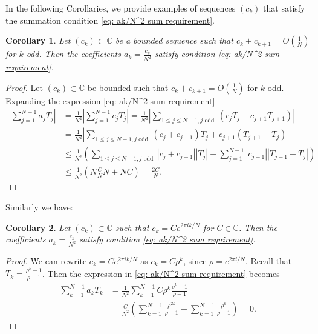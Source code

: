 \documentclass{amsart}
\newtheorem{cor}{Corollary}
\theoremstyle{remark}
\theoremstyle{definition}
\newcommand{\lp}{\left(}
\newcommand{\rp}{\right)}
\begin{document}
In the following Corollaries, we provide examples of sequences $(c_k)$ that satisfy the summation condition \eqref{eq: ak/N^2 sum requirement}. 

\begin{cor}\label{consecutive}
	Let $(c_k)\subset\mathbb{C}$ be a bounded sequence such that $c_k+c_{k+1}=O\lp\frac{1}{N}\rp$ for $k$ odd. Then the coefficients $a_k=\frac{c_k}{N^2}$
satisfy condition \eqref{eq: ak/N^2 sum requirement}.
\end{cor}

\begin{proof}
	Let $(c_k)\subset\mathbb{C}$ be bounded such that $c_k+c_{k+1}=O\lp\frac{1}{N}\rp$ for $k$ odd. 
	Expanding the expression \eqref{eq: ak/N^2 sum requirement} 
	\begin{align*}
        \left|\sum_{j=1}^{N-1}a_jT_j\right| 
        &= \frac{1}{N^2}\left|\sum_{j=1}^{N-1}  c_jT_j\right|=\frac{1}{N^2}\left|\sum_{1\leq j\leq N-1, j \textrm { odd }} (c_jT_j+c_{j+1}T_{j+1})\right|\\
		&= \frac{1}{N^2}\left|\sum_{1\leq j\leq N-1, j \textrm { odd }} (c_j+c_{j+1})T_j+c_{j+1}(T_{j+1}-T_j)\right|\\
        &\leq \frac{1}{N^2}\left(\sum_{1\leq j\leq N-1, j \textrm { odd }} |c_j+c_{j+1}||T_j|+\sum_{j=1}^{N-1}|c_{j+1}||T_{j+1}-T_j|\right)\\
        &\leq \frac{1}{N^2}\left(N\frac{C}{N}N+NC\right)=\frac{2C}{N}.
	\end{align*}
\end{proof}

Similarly we have:

\begin{cor}\label{expsums}
	Let $(c_k)\subset\mathbb{C}$ such that $c_k = Ce^{2\pi ik/N}$ for $C\in\mathbb{C}$. 
	Then the coefficients $a_k=\frac{c_k}{N^2}$ satisfy condition \eqref{eq: ak/N^2 sum requirement}.
\end{cor}

\begin{proof}
	We can rewrite $c_k = Ce^{2\pi ik/N}$ as $c_k=C\rho^k$, since $\rho=e^{2\pi i/N}$. Recall that $T_k=\frac{\rho^k-1}{\rho-1}$.
	Then the expression in \eqref{eq: ak/N^2 sum requirement} becomes 
	\begin{align*}
        \sum_{k=1}^{N-1} a_k T_k
		&= \frac{1}{N^2}\sum_{k=1}^{N-1} C\rho^k\frac{\rho^k-1}{\rho-1}\\
        &= \frac{C}{N^2}\left(\sum_{k=1}^{N-1} \frac{\rho^{2k}}{\rho-1}-\sum_{k=1}^{N-1} \frac{\rho^{k}}{\rho-1}\right)=0.
	\end{align*}
\end{proof}
\end{document}
